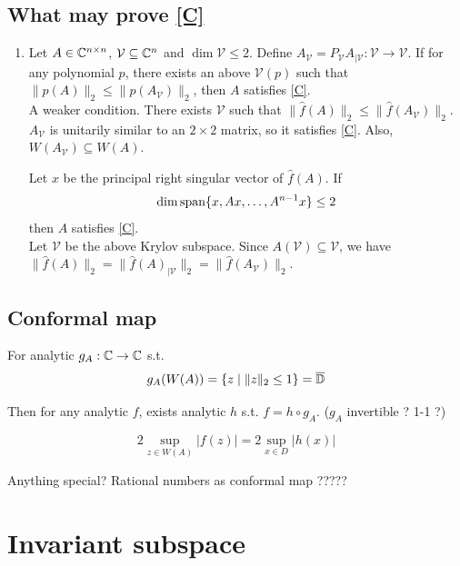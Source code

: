 \documentclass[12pt]{article} %
\begin{document}
\subsection{What may prove \ref{C}}
\begin{enumerate}
    \item Let $A\in \mathbb{C}^{n\times n}$, $\mathcal{V} \subseteq \mathbb{C}^n$ and $\dim \mathcal{V} \le 2$. Define $A_{\mathcal V} = P_{\mathcal V} A_{| \mathcal V}: \mathcal{V} \to \mathcal{V}$. \cite{oloughlin_2023}
        \subitem If for any polynomial $p$, there exists an above $\mathcal{V}(p)$ such that $\|p(A)\|_2 \le \|p(A_{\mathcal V})\|_2$, then $A$ satisfies \ref{C}. \\
        \Rmk A weaker condition. There exists $\mathcal{V}$ such that $\|\hat f (A)\|_2 \le \|\hat f (A_{\mathcal V})\|_2$. \\
        \Prf $A_{\mathcal{V}}$ is unitarily similar to an $2\times 2$ matrix, so it satisfies \ref{C}. Also, $W(A_{\mathcal{V}}) \subseteq W(A)$. \QED

        \subitem Let $x$ be the principal right singular vector of $\hat f(A)$. If 
        \begin{equation}
            \dim \text{span}\{x, Ax, \dots, A^{n-1}x\} \le 2
            \label{dim_Krylov_le_2}
        \end{equation}
        then $A$ satisfies \ref{C}. \\
        \Prf Let $\mathcal{V}$ be the above Krylov subspace. Since $A(\mathcal{V}) \subseteq \mathcal{V}$, we have $\|\hat f (A)\|_2 = \|\hat f (A)_{|\mathcal{V}} \|_2 = \| \hat f (A_\mathcal{V}) \|_2$. \QED 
\end{enumerate}

\subsection{Conformal map}
For analytic $g_A: \mathbb{C} \to \mathbb{C}$ s.t. 
\[ g_A( W(A) ) = \{ z \mid \|z\|_2 \le 1 \}= \overline{\mathbb{D}} \]

Then for any analytic $f$, exists analytic $h$ s.t. $f = h \circ g_A $. ($g_A$ invertible ? 1-1 ?)

\[ 2 \sup_{z\in W(A)} |f(z)| = 2 \sup_{x\in D} |h(x)| \]
\[  \]



Anything special? Rational numbers as conformal map  ?????


\section{Invariant subspace}
\end{document}
